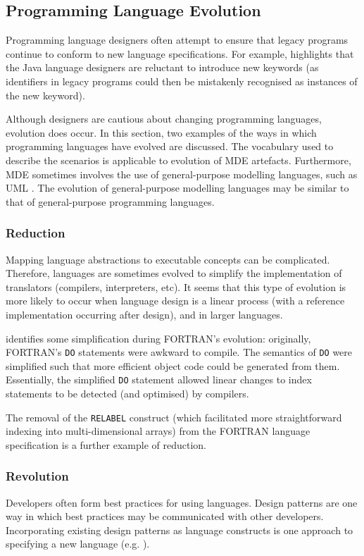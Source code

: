 \subsection{Programming Language Evolution}
Programming language designers often attempt to ensure that legacy programs continue to conform to new language specifications. For example, \cite{cervelle06tatoo} highlights that the Java \cite{java} language designers are reluctant to introduce new keywords (as identifiers in legacy programs could then be mistakenly recognised as instances of the new keyword).

Although designers are cautious about changing programming languages, evolution does occur. In this section, two examples of the ways in which programming languages have evolved are discussed. The vocabulary used to describe the scenarios is applicable to evolution of MDE artefacts. Furthermore, MDE sometimes involves the use of general-purpose modelling languages, such as UML \cite{uml212}. The evolution of general-purpose modelling languages may be similar to that of general-purpose programming languages.

\subsubsection{Reduction}
Mapping language abstractions to executable concepts can be complicated. Therefore, languages are sometimes evolved to simplify the implementation of translators (compilers, interpreters, etc). It seems that this type of evolution is more likely to occur when language design is a linear process (with a reference implementation occurring after design), and in larger languages.

\cite{backus78history} identifies some simplification during FORTRAN's evolution: originally, FORTRAN's \verb|DO| statements were awkward to compile. The semantics of \verb|DO| were simplified such that more efficient object code could be generated from them. Essentially, the simplified \verb|DO| statement allowed linear changes to index statements to be detected (and optimised) by compilers.

The removal of the \verb|RELABEL| construct (which facilitated more straightforward indexing into multi-dimensional arrays) from the FORTRAN language specification \cite{backus78history} is a further example of reduction.

\subsubsection{Revolution}
Developers often form best practices for using languages. Design patterns are one way in which best practices may be communicated with other developers. Incorporating existing design patterns as language constructs is one approach to specifying a new language (e.g. \cite{bosch98patterns}).

